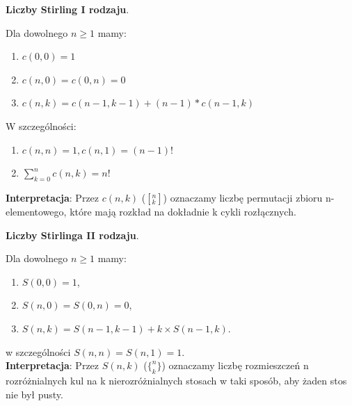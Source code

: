 \documentclass[12pt]{article}
\begin{document}
    \begin{definition}
        \textbf{Liczby Stirling I rodzaju}.

        Dla dowolnego $n \geq 1$ mamy:
        \begin{enumerate}
            \item $c(0,0) = 1$
            \item $c(n,0) = c(0,n) = 0$
            \item $c(n,k) = c(n-1, k-1) + (n-1) * c(n-1, k)$
        \end{enumerate}
        W szczególności:
        \begin{enumerate}
            \item $c(n,n) = 1, c(n,1) = (n-1)!$
            \item $\sum^n_{k=0} c(n,k) = n!$
        \end{enumerate}

        \textbf{Interpretacja}: Przez $c(n,k)$ ($[^n_k]$) oznaczamy liczbę permutacji zbioru n-elementowego, które mają rozkład
        na dokładnie k cykli rozłącznych.
    \end{definition}

    \begin{definition}
        \textbf{Liczby Stirlinga II rodzaju}.

        Dla dowolnego $n \geq 1$ mamy:
        \begin{enumerate}
            \item $S(0,0) = 1$,
            \item $S(n,0) = S(0,n) = 0$,
            \item $S(n,k) = S(n-1, k-1) + k \times S(n-1, k)$.
        \end{enumerate}
        w szczególności  $S(n,n) = S(n,1) = 1$.\\

        \textbf{Interpretacja}: Przez $S(n,k)$ ($\{^n_k\}$) oznaczamy liczbę rozmieszczeń n rozróżnialnych kul na k nierozróżnialnych stosach w taki sposób,
        aby żaden stos nie był pusty.
    \end{definition}


    \newpage
\end{document}
